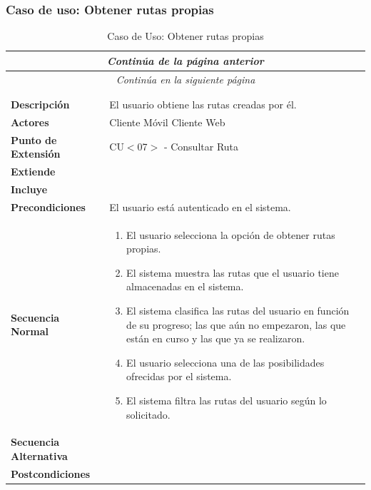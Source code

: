 \newpage
\subsubsection*{Caso de uso: Obtener rutas propias}
\begin{longtable}{| p{4cm} | p{10cm} |}
\endfirsthead
\multicolumn{2}{c}{\textit{Continúa de la página anterior}}\\[12pt]
\hline
\endhead
\hline
\multicolumn{2}{c}{\textit{Continúa en la siguiente página}} \\
\endfoot
\hline
\caption{Caso de Uso: Obtener rutas propias}\label{fig:1}\\
\endlastfoot


\hline
\multicolumn{2}{|c|}{\textbf{CU$<$05$>$ - Obtener Rutas Propias}} \\

\hline
\textbf{Descripción} &
El usuario obtiene las rutas creadas por él.\\

\hline
\textbf{Actores} &
Cliente Móvil\newline
Cliente Web\\

\hline
\textbf{Punto de Extensión} &
CU$<$07$>$ - Consultar Ruta
\\

\hline
\textbf{Extiende} &
\\

\hline
\textbf{Incluye} &
\\

\hline
\textbf{Precondiciones} &
El usuario está autenticado en el sistema.\\

\hline
\textbf{Secuencia Normal} &\mbox{}\par\vspace{-\baselineskip}
\begin{enumerate}[leftmargin=0.7cm, topsep=0.1cm]
\item El usuario selecciona la opción de obtener rutas propias.
\item El sistema muestra las rutas que el usuario tiene almacenadas en el sistema.
\item El sistema clasifica las rutas del usuario en función de su progreso; las que aún no empezaron, las que están en curso y las que ya se realizaron.
\item El usuario selecciona una de las posibilidades ofrecidas por el sistema.
\item El sistema filtra las rutas del usuario según lo solicitado.
\end{enumerate}\\

\hline
\textbf{Secuencia Alternativa} &\mbox{}\par\vspace{-\baselineskip}
\\

\hline
\textbf{Postcondiciones} & 
\\
\hline
\end{longtable}




